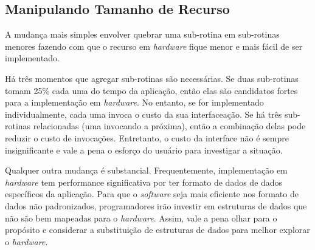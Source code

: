 \subsection{Manipulando Tamanho de Recurso}

A mudança mais simples envolver quebrar uma sub-rotina em sub-rotinas menores fazendo com que o recurso em \textit{hardware} fique menor e mais fácil de ser implementado.



Há três momentos que agregar sub-rotinas são necessárias. Se duas sub-rotinas tomam 25\% cada uma do tempo da aplicação, então elas são candidatos fortes para a implementação em \textit{hardware}. No entanto, se for implementado individualmente, cada uma invoca o custo da sua interfaceação. Se há três sub-rotinas relacionadas (uma invocando a próxima), então a combinação delas pode reduzir o custo de invocações. Entretanto, o custo da interface não é sempre insignificante e vale a pena o esforço do usuário para investigar a situação.



Qualquer outra mudança é substancial. Frequentemente, implementação em \textit{hardware} tem performance significativa por ter formato de dados de dados específicos da aplicação. Para que o \textit{software} seja mais eficiente nos formato de dados não padronizados, programadores irão investir em estruturas de dados que não são bem mapeadas para o \textit{hardware}. Assim, vale a pena olhar para o propósito e considerar a substituição de estruturas de dados para melhor explorar o \textit{hardware}.

